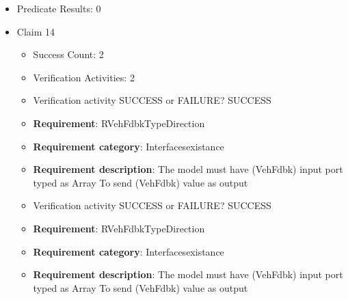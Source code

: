 \documentclass{article}
\begin{document}
\begin{itemize}
\begin{itemize}
						\item \textbf{Requirement}: RPoseTypeDirection 
						\item \textbf{Requirement category}: Interfacesexistance 
						\item \textbf{Requirement description}: The model must have (Pose) input port typed as BusVehiclePose To get (Pose) value as input
					
					\item Verification activity SUCCESS or FAILURE? SUCCESS
		
						\item \textbf{Requirement}: RPoseTypeDirection 
						\item \textbf{Requirement category}: Interfacesexistance 
						\item \textbf{Requirement description}: The model must have (Pose) input port typed as BusVehiclePose To get (Pose) value as input
					
				\end{itemize}
				
									    
				\item Predicate Results: 0

  				  \item Claim 14
				\begin{itemize}
			    	\item Success Count: 2 
			    	\item Verification Activities: 2
					\item Verification activity SUCCESS or FAILURE? SUCCESS
		
						\item \textbf{Requirement}: RVehFdbkTypeDirection 
						\item \textbf{Requirement category}: Interfacesexistance 
						\item \textbf{Requirement description}: The model must have (VehFdbk) input port typed as Array To send (VehFdbk) value as output
					
					\item Verification activity SUCCESS or FAILURE? SUCCESS
		
						\item \textbf{Requirement}: RVehFdbkTypeDirection 
						\item \textbf{Requirement category}: Interfacesexistance 
						\item \textbf{Requirement description}: The model must have (VehFdbk) input port typed as Array To send (VehFdbk) value as output
					

\end{itemize}
\end{itemize}
\end{document}
